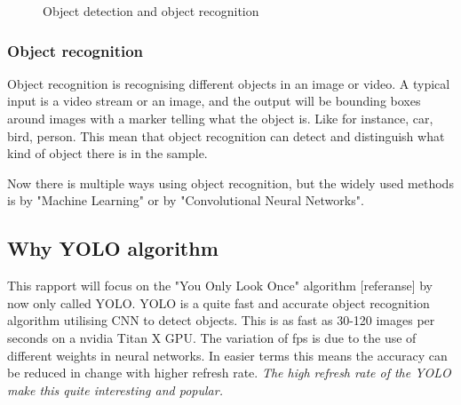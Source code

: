 \begin{figure}%
    \centering
    \qquad
    \caption{Object detection and object recognition}
    \label{fig:OdVsOr}
\end{figure}

\subsubsection*{Object recognition}
Object recognition is recognising different objects in an image or video. A typical input is a video stream or an image, and the output will be bounding boxes around images with a marker telling what the object is. Like for instance, car, bird, person. This mean that object recognition can detect and distinguish what kind of object there is in the sample.

Now there is multiple ways using object recognition, but the widely used methods is by "Machine Learning" or by "Convolutional Neural Networks".

\subsection{ Why YOLO algorithm}
This rapport will focus on the "You Only Look Once" algorithm [referanse] by now only called YOLO. YOLO is a quite fast and accurate object recognition algorithm utilising CNN to detect objects. This is as fast as 30-120 images per seconds on a nvidia Titan X GPU. The variation of fps is due to the use of different weights in neural networks. In easier terms this means the accuracy can be reduced in change with higher refresh rate. \textit{The high refresh rate of the YOLO make this quite interesting and popular. }
